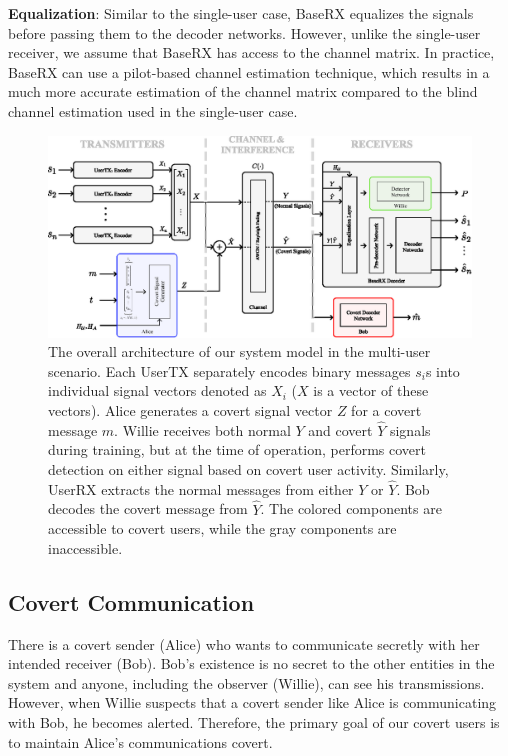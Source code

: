 \textbf{Equalization}: Similar to the single-user case, BaseRX equalizes the signals before passing them to the decoder networks. However, unlike the single-user receiver, we assume that BaseRX has access to the channel matrix. In practice, BaseRX can use a pilot-based channel estimation technique, which results in a much more accurate estimation of the channel matrix compared to the blind channel estimation used in the single-user case.

\begin{figure}[tp!]
	\center
	\includegraphics[width=.7\linewidth]{figs/multi_system_architecture}
	\caption{The overall architecture of our system model in the multi-user scenario. Each UserTX separately encodes binary messages $s_i$s into individual signal vectors denoted as $X_i$ ($X$ is a vector of these vectors). Alice generates a covert signal vector $Z$ for a covert message $m$. Willie receives both normal $Y$ and covert $\hat{Y}$ signals during training, but at the time of operation, performs covert detection on either signal based on covert user activity. Similarly, UserRX extracts the normal messages from either $Y$ or $\hat{Y}$. Bob decodes the covert message from $\hat{Y}$. The colored components are accessible to covert users, while the gray components are inaccessible.}
	\label{fig:multi_system_architecture}
\end{figure}

\subsection{Covert Communication}
There is a covert sender (Alice) who wants to communicate secretly with her intended receiver (Bob). Bob's existence is no secret to the other entities in the system and anyone, including the observer (Willie), can see his transmissions. However, when Willie suspects that a covert sender like Alice is communicating with Bob, he becomes alerted. Therefore, the primary goal of our covert users is to maintain Alice's communications covert.

